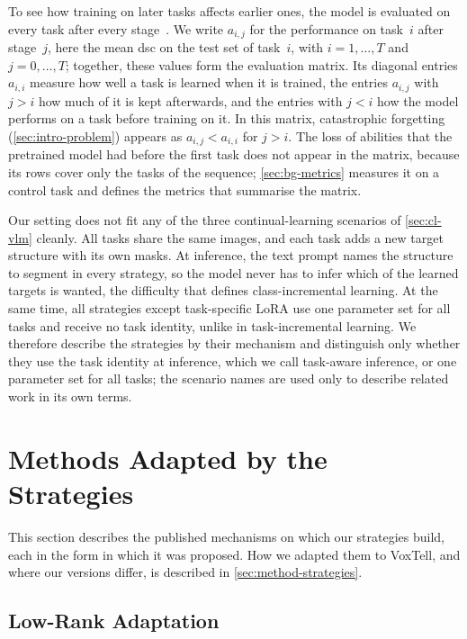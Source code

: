 To see how training on later tasks affects earlier ones, the model is evaluated on every task after every stage~\cite[Fig.~4b]{zheng2023preventingzeroshottransferdegradation}.
We write $a_{i,j}$ for the performance on task~$i$ after stage~$j$, here the mean \gls{dsc} on the test set of task~$i$, with $i = 1, \dots, T$ and $j = 0, \dots, T$; together, these values form the evaluation matrix.
Its diagonal entries $a_{i,i}$ measure how well a task is learned when it is trained, the entries $a_{i,j}$ with $j > i$ how much of it is kept afterwards, and the entries with $j < i$ how the model performs on a task before training on it.
In this matrix, catastrophic forgetting (\cref{sec:intro-problem}) appears as $a_{i,j} < a_{i,i}$ for $j > i$.
The loss of abilities that the pretrained model had before the first task does not appear in the matrix, because its rows cover only the tasks of the sequence; \cref{sec:bg-metrics} measures it on a control task and defines the metrics that summarise the matrix.

Our setting does not fit any of the three continual-learning scenarios of \cref{sec:cl-vlm} cleanly.
All tasks share the same images, and each task adds a new target structure with its own masks.
At inference, the text prompt names the structure to segment in every strategy, so the model never has to infer which of the learned targets is wanted, the difficulty that defines class-incremental learning.
At the same time, all strategies except task-specific LoRA use one parameter set for all tasks and receive no task identity, unlike in task-incremental learning.
We therefore describe the strategies by their mechanism and distinguish only whether they use the task identity at inference, which we call task-aware inference, or one parameter set for all tasks; the scenario names are used only to describe related work in its own terms.

\section{Methods Adapted by the Strategies}
\label{sec:bg-methods}

This section describes the published mechanisms on which our strategies build, each in the form in which it was proposed.
How we adapted them to VoxTell, and where our versions differ, is described in \cref{sec:method-strategies}.

\subsection{Low-Rank Adaptation}
\label{subsec:bg-lora}

